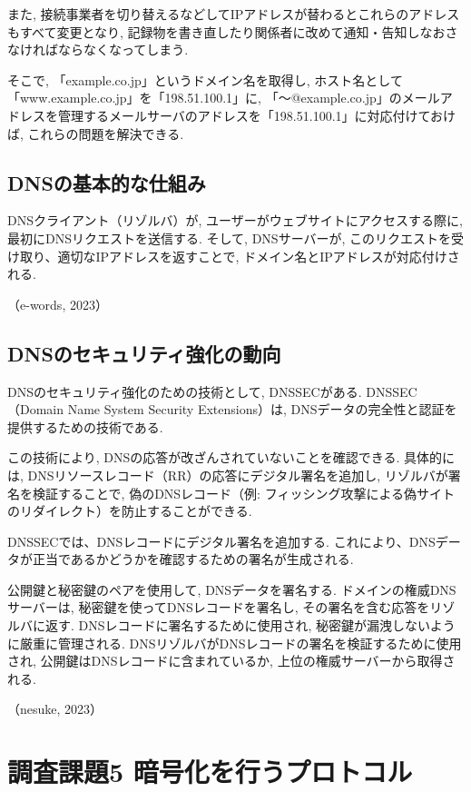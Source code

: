 \documentclass{ltjsarticle} %
\begin{document}
また, 接続事業者を切り替えるなどしてIPアドレスが替わるとこれらのアドレスもすべて変更となり, 
記録物を書き直したり関係者に改めて通知・告知しなおさなければならなくなってしまう. 

\vspace{0.5cm}

そこで, 「example.co.jp」というドメイン名を取得し, ホスト名として「www.example.co.jp」を「198.51.100.1」に, 
「～@example.co.jp」のメールアドレスを管理するメールサーバのアドレスを「198.51.100.1」に対応付けておけば, 
これらの問題を解決できる. 

\subsection{DNSの基本的な仕組み}
DNSクライアント（リゾルバ）が, ユーザーがウェブサイトにアクセスする際に, 最初にDNSリクエストを送信する. 
そして, DNSサーバーが, このリクエストを受け取り、適切なIPアドレスを返すことで, ドメイン名とIPアドレスが対応付けされる. 

（e-words, 2023）


\subsection{DNSのセキュリティ強化の動向}
DNSのセキュリティ強化のための技術として, DNSSECがある. 
DNSSEC（Domain Name System Security Extensions）は, DNSデータの完全性と認証を提供するための技術である. 

\vspace{0.5cm}

この技術により, DNSの応答が改ざんされていないことを確認できる. 
具体的には, DNSリソースレコード（RR）の応答にデジタル署名を追加し, リゾルバが署名を検証することで, 
偽のDNSレコード（例: フィッシング攻撃による偽サイトのリダイレクト）を防止することができる. 

DNSSECでは、DNSレコードにデジタル署名を追加する. 
これにより、DNSデータが正当であるかどうかを確認するための署名が生成される. 

公開鍵と秘密鍵のペアを使用して, DNSデータを署名する. 
ドメインの権威DNSサーバーは, 秘密鍵を使ってDNSレコードを署名し, その署名を含む応答をリゾルバに返す. 
DNSレコードに署名するために使用され, 秘密鍵が漏洩しないように厳重に管理される. 
DNSリゾルバがDNSレコードの署名を検証するために使用され, 
公開鍵はDNSレコードに含まれているか, 上位の権威サーバーから取得される. 

（nesuke, 2023）


\section{調査課題5 暗号化を行うプロトコル}
\end{document}
